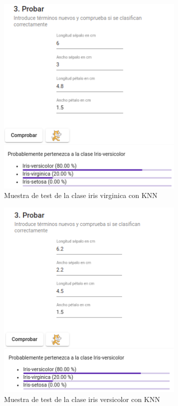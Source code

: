 \documentclass[a4paper, 12pt]{book}
\begin{document}
\begin{figure}
	\centering
	\includegraphics[width=9cm, keepaspectratio]{img/iris_vir_num_knn.png}
	\caption{Muestra de test de la clase iris virginica con KNN} 	\label{fig:ejemplo14}
\end{figure}

\begin{figure}
	\centering
	\includegraphics[width=9cm, keepaspectratio]{img/iris_ver_num_knn.png}
	\caption{Muestra de test de la clase iris versicolor con KNN} 	\label{fig:ejemplo15}
\end{figure}
\end{document}
